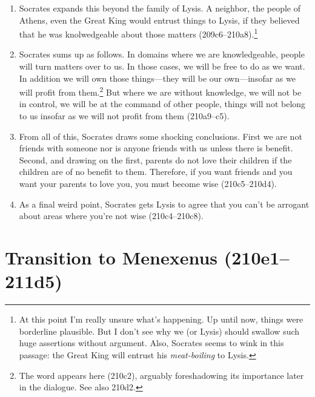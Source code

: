 \documentclass[11pt]{article}
\begin{document}
\begin{enumerate}
    \item Socrates expands this beyond the family of Lysis.  A neighbor,
        the people of Athens, even the Great King would entrust things to
        Lysis, if they believed that he was knolwedgeable about those
        matters (209c6--210a8).\footnote{At this point I'm really unsure
        what's happening.  Up until now, things were borderline plausible.
        But I don't see why we (or Lysis) should swallow such huge
        assertions without argument.  Also, Socrates seems to wink in this
        passage: the Great King will entrust his \emph{meat-boiling} to
        Lysis.}

    \item Socrates sums up as follows.  In domains where we are
        knowledgeable, people will turn matters over to us.  In those
        cases, we will be free to do as we want. In addition we will own
        those things---they will be our own---insofar as we will profit
        from them.\footnote{The word  appears here
        (210c2), arguably foreshadowing its importance later in the
        dialogue. See also 210d2.}  But where we are without knowledge, we
        will not be in control, we will be at the command of other people,
        things will not belong to us insofar as we will not profit from
        them (210a9--c5).

    \item From all of this, Socrates draws some shocking conclusions.
        First we are not friends with someone nor is anyone friends with us
        unless there is benefit.  Second, and drawing on the first, parents
        do not love their children if the children are of no benefit to
        them.  Therefore, if you want friends and you want your parents to
        love you, you must become wise (210c5--210d4).

    \item As a final weird point, Socrates gets Lysis to agree that you
        can't be arrogant about areas where you're not wise (210c4--210c8).

\end{enumerate}


\section{Transition to Menexenus (210e1--211d5)}
\end{document}
